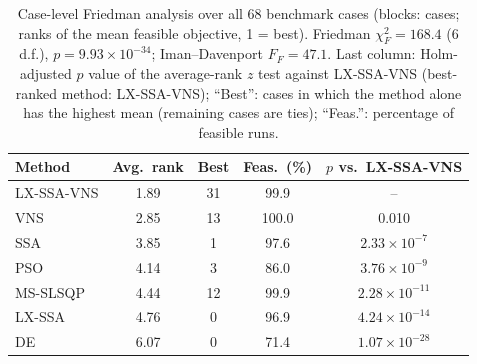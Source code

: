 \begin{table}[!t]
\centering
\caption{Case-level Friedman analysis over all 68 benchmark cases (blocks: cases; ranks of the mean feasible objective, 1 = best). Friedman $\chi^2_F=168.4$ (6 d.f.), $p=9.93\times10^{-34}$; Iman--Davenport $F_F=47.1$. Last column: Holm-adjusted $p$ value of the average-rank $z$ test against LX-SSA-VNS (best-ranked method: LX-SSA-VNS); ``Best'': cases in which the method alone has the highest mean (remaining cases are ties); ``Feas.'': percentage of feasible runs.}
\label{tab:friedman68}
\scriptsize\setlength{\tabcolsep}{3pt}
\begin{tabular}{lcccc}
\toprule
Method & Avg.\ rank & Best & Feas.\ (\%) & $p$ vs.\ LX-SSA-VNS \\
\midrule
LX-SSA-VNS & 1.89 & 31 & 99.9 & -- \\
VNS & 2.85 & 13 & 100.0 & 0.010 \\
SSA & 3.85 & 1 & 97.6 & $2.33\times10^{-7}$ \\
PSO & 4.14 & 3 & 86.0 & $3.76\times10^{-9}$ \\
MS-SLSQP & 4.44 & 12 & 99.9 & $2.28\times10^{-11}$ \\
LX-SSA & 4.76 & 0 & 96.9 & $4.24\times10^{-14}$ \\
DE & 6.07 & 0 & 71.4 & $1.07\times10^{-28}$ \\
\bottomrule
\end{tabular}
\end{table}

